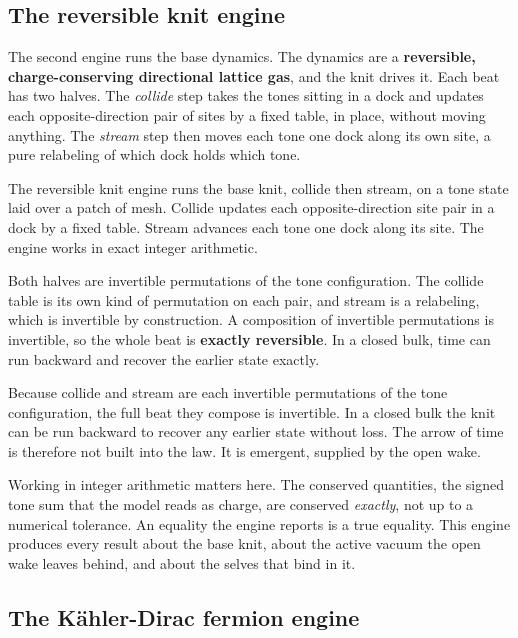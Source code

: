 \subsection{The reversible knit engine}

The second engine runs the base dynamics. The dynamics are a \textbf{reversible, charge-conserving directional lattice gas}, and the knit drives it. Each beat has two halves. The \emph{collide} step takes the tones sitting in a dock and updates each opposite-direction pair of sites by a fixed table, in place, without moving anything. The \emph{stream} step then moves each tone one dock along its own site, a pure relabeling of which dock holds which tone.

\begin{definition}
The reversible knit engine runs the base knit, collide then stream, on a tone state laid over a patch of mesh. Collide updates each opposite-direction site pair in a dock by a fixed table. Stream advances each tone one dock along its site. The engine works in exact integer arithmetic.
\end{definition}

Both halves are invertible permutations of the tone configuration. The collide table is its own kind of permutation on each pair, and stream is a relabeling, which is invertible by construction. A composition of invertible permutations is invertible, so the whole beat is \textbf{exactly reversible}. In a closed bulk, time can run backward and recover the earlier state exactly.

\begin{result}
Because collide and stream are each invertible permutations of the tone configuration, the full beat they compose is invertible. In a closed bulk the knit can be run backward to recover any earlier state without loss. The arrow of time is therefore not built into the law. It is emergent, supplied by the open wake.
\end{result}

Working in integer arithmetic matters here. The conserved quantities, the signed tone sum that the model reads as charge, are conserved \emph{exactly}, not up to a numerical tolerance. An equality the engine reports is a true equality. This engine produces every result about the base knit, about the active vacuum the open wake leaves behind, and about the selves that bind in it.

\subsection{The K\"ahler-Dirac fermion engine}

